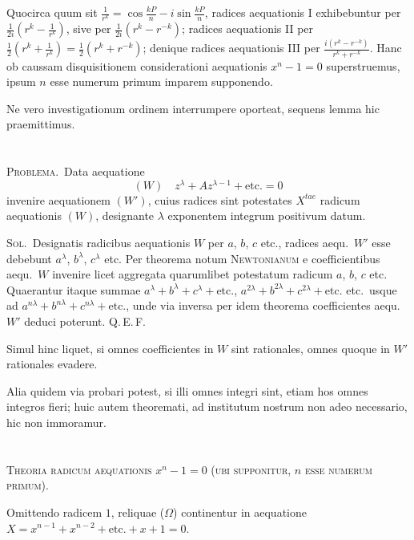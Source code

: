 \documentclass[12pt,a4paper]{article}
\theoremstyle{plain}
\theoremstyle{definition}
\theoremstyle{remark}
\begin{document}
Quocirca quum sit $\frac{1}{r^k}=\cos\frac{kP}{n}-i\sin\frac{kP}{n}$, radices aequationis I exhibebuntur per $\frac{1}{2i}(r^k-\frac{1}{r^k})$, sive per $\frac{1}{2i}(r^k-r^{-k})$; radices aequationis II per $\frac{1}{2}(r^k+\frac{1}{r^k})=\frac{1}{2}(r^k+r^{-k})$; denique radices aequationis III per $\frac{i(r^k-r^{-k})}{r^k+r^{-k}}$. Hanc ob caussam disquisitionem considerationi aequationis $x^n-1=0$ superstruemus, ipsum $n$ esse numerum primum imparem supponendo.

Ne vero investigationum ordinem interrumpere oporteat, sequens lemma hic praemittimus.

\section{}

\textsc{Problema.}\ Data aequatione
\begin{equation}
(W)\quad z^\lambda+Az^{\lambda-1}+\text{etc.}=0\tag{W}
\end{equation}
invenire aequationem $(W')$, cuius radices sint potestates $X^{tae}$ radicum aequationis $(W)$, designante $\lambda$ exponentem integrum positivum datum.

\textsc{Sol.}\ Designatis radicibus aequationis $W$ per $a$, $b$, $c$ etc., radices aequ.\ $W'$ esse debebunt $a^\lambda$, $b^\lambda$, $c^\lambda$ etc. Per theorema notum \textsc{Newtonianum} e coefficientibus aequ.\ $W$ invenire licet aggregata quarumlibet potestatum radicum $a$, $b$, $c$ etc. Quaerantur itaque summae $a^\lambda+b^\lambda+c^\lambda+\text{etc.}$, $a^{2\lambda}+b^{2\lambda}+c^{2\lambda}+\text{etc.}$ etc.\ usque ad $a^{n\lambda}+b^{n\lambda}+c^{n\lambda}+\text{etc.}$, unde via inversa per idem theorema coefficientes aequ.\ $W'$ deduci poterunt. Q.\,E.\,F.

Simul hinc liquet, si omnes coefficientes in $W$ sint rationales, omnes quoque in $W'$ rationales evadere.

Alia quidem via probari potest, si illi omnes integri sint, etiam hos omnes integros fieri; huic autem theoremati, ad institutum nostrum non adeo necessario, hic non immoramur.

\section{}

\textsc{Theoria radicum aequationis $x^n-1=0$ (ubi supponitur, $n$ esse numerum primum).}

Omittendo radicem $1$, reliquae ($\Omega$) continentur in aequatione $X=x^{n-1}+x^{n-2}+\text{etc.}+x+1=0$.
\end{document}
